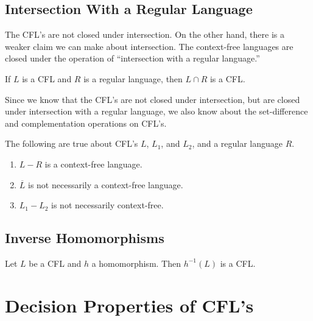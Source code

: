 \documentclass[]{article}
\begin{document}
  \subsection*{Intersection With a Regular Language}
    The CFL's are not closed under intersection. On the other hand, there is a
    weaker claim we can make about intersection. The context-free languages are
    closed under the operation of ``intersection with a regular language.''
      \begin{thm}
        If $L$ is a CFL and $R$ is a regular language, then $L \cap R$ is a CFL.
      \end{thm}
    Since we know that the CFL's are not closed under intersection, but are
    closed under intersection with a regular language, we also know about the
    set-difference and complementation operations on CFL's.
      \begin{thm}
        The following are true about CFL's $L$, $L_1$, and $L_2$, and a regular
        language $R$.
          \begin{enumerate}
            \item $L - R$ is a context-free language.
            \item $\overline{L}$ is not necessarily a context-free language.
            \item $L_1 - L_2$ is not necessarily context-free.
          \end{enumerate}
      \end{thm}

  \subsection*{Inverse Homomorphisms}
    \begin{thm}
      Let $L$ be a CFL and $h$ a homomorphism. Then $h^{-1}(L)$ is a CFL.
    \end{thm}

\section*{Decision Properties of CFL's}
\end{document}
